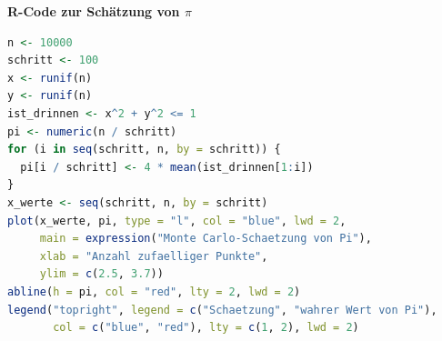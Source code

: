 \documentclass[aodsor,preprint]{imsart}
\numberwithin{equation}{section}
\theoremstyle{plain}
\begin{document}
\textbf{R-Code zur Schätzung von \texorpdfstring{$\pi$}{π}}

\begin{lstlisting}[language=R, caption={Monte-Carlo-Schaetzung von $\pi$ mit R}, label={lst:pi_montecarlo}]
n <- 10000
schritt <- 100
x <- runif(n)
y <- runif(n)
ist_drinnen <- x^2 + y^2 <= 1
pi <- numeric(n / schritt)
for (i in seq(schritt, n, by = schritt)) {
  pi[i / schritt] <- 4 * mean(ist_drinnen[1:i])
}
x_werte <- seq(schritt, n, by = schritt)
plot(x_werte, pi, type = "l", col = "blue", lwd = 2,
     main = expression("Monte Carlo-Schaetzung von Pi"),
     xlab = "Anzahl zufaelliger Punkte",
     ylim = c(2.5, 3.7))
abline(h = pi, col = "red", lty = 2, lwd = 2)
legend("topright", legend = c("Schaetzung", "wahrer Wert von Pi"),
       col = c("blue", "red"), lty = c(1, 2), lwd = 2)
\end{lstlisting}


\newpage


\end{document}
